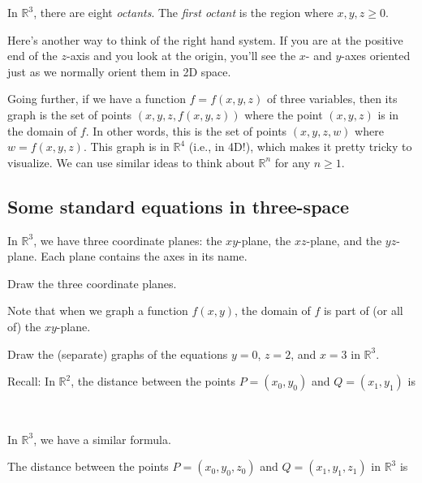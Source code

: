 In $\mathbb{R}^3$, there are eight \emph{octants}. The \emph{first octant} is the region where $x,y,z\ge0$.
\bigskip 

Here's another way to think of the right hand system. If you are at the positive end of the $z$-axis and you look at the origin, you'll see the $x$- and $y$-axes oriented just as we normally orient them in 2D space.

\vspace{.5in}

\pagebreak 
Going further, if we have a function $f=f(x,y,z)$ of three variables, then its graph is the set of points $(x,y,z,f(x,y,z))$ where the point $(x,y,z)$ is in the domain of $f$. In other words, this is the set of points $(x,y,z,w)$ where $w=f(x,y,z)$. This graph is in $\mathbb{R}^4$ (i.e., in 4D!), which makes it pretty tricky to visualize. We can use similar ideas to think about $\mathbb{R}^n$ for any $n\ge1$.

\subsection{Some standard equations in three-space}
In $\mathbb{R}^3$, we have three coordinate planes: the $xy$-plane, the $xz$-plane, and the $yz$-plane. Each plane contains the axes in its name.
\begin{ex}
    Draw the three coordinate planes.
\end{ex}

\vspace{2in}

Note that when we graph a function $f(x,y)$, the domain of $f$ is part of (or all of) the $xy$-plane.

\begin{ex}
    Draw the (separate) graphs of the equations $y=0$, $z=2$, and $x=3$ in $\mathbb{R}^3$.
\end{ex}

\vspace{2.5in}

Recall: In $\mathbb{R}^2$, the distance between the points $P=(x_0,y_0)$ and $Q=(x_1,y_1)$ is 
\[
    \phantom{\sqrt{(x_1-x_0)^2+(y_1-y_0)^2}.}
\]

\vspace{1in}

\pagebreak 

In $\mathbb{R}^3$, we have a similar formula. 
\begin{framed}
    The distance between the points $P=(x_0,y_0,z_0)$ and $Q=(x_1,y_1,z_1)$ in $\mathbb{R}^3$ is
    \[
        \phantom{\sqrt{(x_1-x_0)^2+(y_1-y_0)^2+(z_1-z_0)^2}.}
    \]
\end{framed}

